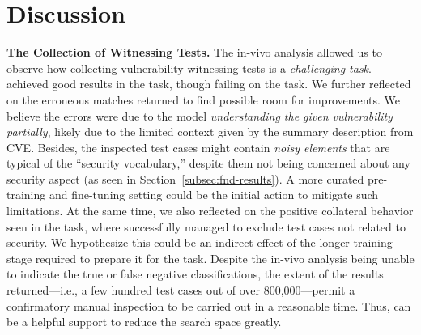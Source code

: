 \section{Discussion}
\label{sec:discussion}

\textbf{The Collection of Witnessing Tests.}
The in-vivo analysis allowed us to observe how collecting vulnerability-witnessing tests is a \textit{challenging task}.
\vuteco achieved good results in the \finding task, though failing on the \matching task.
We further reflected on the erroneous matches returned to find possible room for improvements.
We believe the errors were due to the model \textit{understanding the given vulnerability partially}, likely due to the limited context given by the summary description from CVE.
Besides, the inspected test cases might contain \textit{noisy elements} that are typical of the ``security vocabulary,'' despite them not being concerned about any security aspect (as seen in Section~\ref{subsec:fnd-results}).
A more curated pre-training and fine-tuning setting could be the initial action to mitigate such limitations.
%
At the same time, we also reflected on the positive collateral behavior seen in the \matching task, where \vuteco successfully managed to exclude test cases not related to security.
We hypothesize this could be an indirect effect of the longer training stage required to prepare it for the \matching task.
%
Despite the in-vivo analysis being unable to indicate the true or false negative classifications, the extent of the results \vuteco returned---i.e., a few hundred test cases out of over 800,000---permit a confirmatory manual inspection to be carried out in a reasonable time.
Thus, \vuteco can be a helpful support to reduce the search space greatly.

